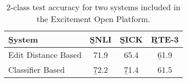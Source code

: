 %

%
%

\begin{table}
\begin{center}
\def\t#1{\small{#1}}
\begin{tabular}{l@{\hskip \colspaceL}c@{\hskip \colspaceL}c@{\hskip \colspaceL}c}
\toprule
\b{System} & \b{SNLI} & \b{SICK} & \b{RTE-3} \\
\midrule
\t{Edit Distance Based}        & \t{71.9} & \t{65.4} & \b{61.9} \\
\t{Classifier Based}           & \b{72.2} & \b{71.4} & \t{61.5} \\
\bottomrule
\end{tabular}
\end{center}
\caption{
\label{tab:eopresults}
2-class test accuracy for two systems included in the
  Excitement Open Platform.
}
\end{table}
%
%


